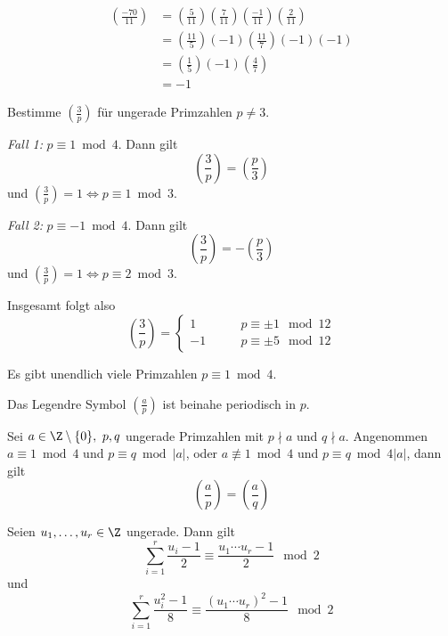 \begin{exmp*}
	\begin{align*}
		\left( \frac{-70}{11} \right) &= \left( \frac{5}{11} \right) \left( \frac{7}{11} \right) \left( \frac{-1}{11} \right) \left( \frac{2}{11} \right)\\
		&= \left( \frac{11}{5} \right) (-1) \left( \frac{11}{7} \right) (-1)(-1)\\
		&= \left( \frac{1}{5} \right) (-1) \left( \frac{4}{7} \right)\\
		&= -1
	\end{align*}
\end{exmp*}

\begin{exmp*}
	Bestimme $\left(\frac{3}{p}\right)$ für ungerade Primzahlen $p \neq 3$.
	
	\emph{Fall 1:} $p \equiv 1 \bmod 4$. Dann gilt
	\[ \left(\frac{3}{p}\right) = \left(\frac{p}{3}\right) \]
	und $\left(\frac{3}{p}\right) = 1 \iff p \equiv 1 \bmod 3$.
	
	\emph{Fall 2:} $p \equiv -1 \bmod 4$. Dann gilt
	\[ \left(\frac{3}{p}\right) = -\left(\frac{p}{3}\right) \]
	und $\left(\frac{3}{p}\right) = 1 \iff p \equiv 2 \bmod 3$.
	
	Insgesamt folgt also
	\[ \left(\frac{3}{p}\right) = \begin{cases}
		1 \qquad & p \equiv \pm 1 \mod 12\\
		-1 \qquad & p \equiv \pm 5 \mod 12
	\end{cases} \]
\end{exmp*}

\begin{thm}\autolabel
	Es gibt unendlich viele Primzahlen $p \equiv 1 \bmod 4$.
\end{thm}

\begin{obs*}
	Das Legendre Symbol $\left(\frac{a}{p}\right)$ ist beinahe periodisch in $p$.\video
\end{obs*} 

\begin{thm}\autolabel
	Sei $a \in \Z\setminus\{0\},\ p,q $ ungerade Primzahlen mit $p \nmid a$ und $q \nmid a$. Angenommen $a \equiv 1 \bmod 4$ und $p \equiv q \bmod |a|$, oder $a \not\equiv 1 \bmod 4$ und $p \equiv q \bmod 4|a|$, dann gilt
	\[ \left(\frac{a}{p}\right) = \left(\frac{a}{q}\right) \]
\end{thm}

\begin{lem}\autolabel
	Seien $u_1,\dotsc,u_r \in \Z$ ungerade. Dann gilt
	\[ \sum_{i=1}^r \frac{u_i -1}{2} \equiv \frac{u_1 \dotsm u_r - 1}{2} \mod 2 \]
	und
	\[ \sum_{i=1}^r \frac{u_i^2 -1}{8} \equiv \frac{(u_1\dotsm u_r)^2-1}{8} \mod 2 \]
\end{lem}

